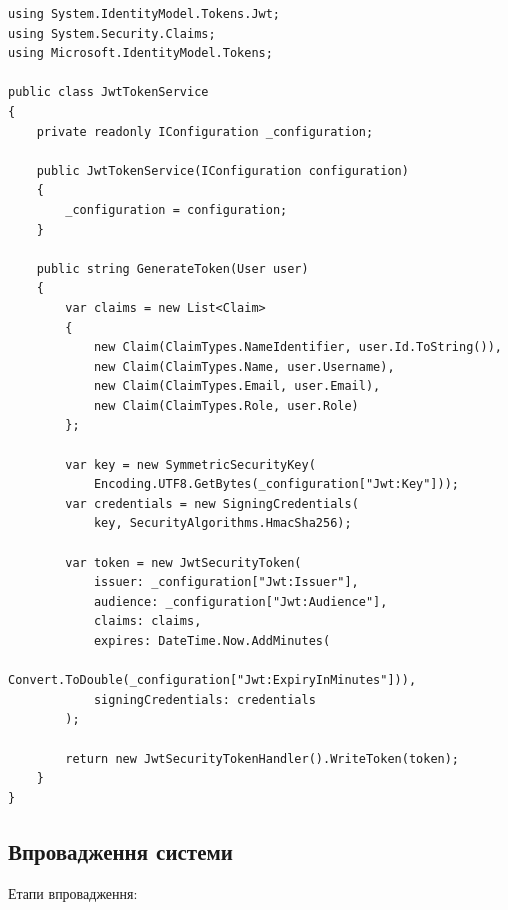 \documentclass[14pt,a4paper]{extarticle}
\begin{document}
\begin{lstlisting}[language={[Sharp]C}, caption=Сервіс генерації JWT токенів, basicstyle=\small\ttfamily, breaklines=true, frame=single]
using System.IdentityModel.Tokens.Jwt;
using System.Security.Claims;
using Microsoft.IdentityModel.Tokens;

public class JwtTokenService
{
    private readonly IConfiguration _configuration;
    
    public JwtTokenService(IConfiguration configuration)
    {
        _configuration = configuration;
    }
    
    public string GenerateToken(User user)
    {
        var claims = new List<Claim>
        {
            new Claim(ClaimTypes.NameIdentifier, user.Id.ToString()),
            new Claim(ClaimTypes.Name, user.Username),
            new Claim(ClaimTypes.Email, user.Email),
            new Claim(ClaimTypes.Role, user.Role)
        };
        
        var key = new SymmetricSecurityKey(
            Encoding.UTF8.GetBytes(_configuration["Jwt:Key"]));
        var credentials = new SigningCredentials(
            key, SecurityAlgorithms.HmacSha256);
        
        var token = new JwtSecurityToken(
            issuer: _configuration["Jwt:Issuer"],
            audience: _configuration["Jwt:Audience"],
            claims: claims,
            expires: DateTime.Now.AddMinutes(
                Convert.ToDouble(_configuration["Jwt:ExpiryInMinutes"])),
            signingCredentials: credentials
        );
        
        return new JwtSecurityTokenHandler().WriteToken(token);
    }
}
\end{lstlisting}

\newpage
\subsection{Впровадження системи}

Етапи впровадження:
\end{document}
